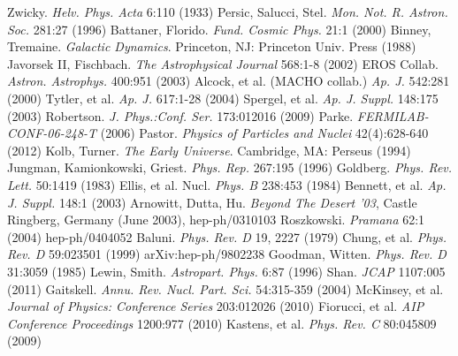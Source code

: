 \documentclass[a4paper,12pt]{article}
\begin{document}
{\begin{thebibliography}{1}
 Zwicky.  \emph{Helv. Phys. Acta} 6:110 (1933)
 Persic, Salucci, Stel.  \emph{Mon. Not. R. Astron. Soc.} 281:27 (1996)
 Battaner, Florido.  \emph{Fund. Cosmic Phys.} 21:1 (2000)
 Binney, Tremaine. \emph{Galactic Dynamics}. Princeton, NJ: Princeton Univ. Press (1988)
 Javorsek II, Fischbach. \emph{The Astrophysical Journal} 568:1-8 (2002)
 EROS Collab.  \emph{Astron. Astrophys.} 400:951 (2003)
 Alcock, et al. (MACHO collab.)  \emph{Ap. J.} 542:281 (2000)
 Tytler, et al. \emph{Ap. J.} 617:1-28 (2004)
 Spergel, et al. \emph{Ap. J. Suppl.} 148:175 (2003)
 Robertson. \emph{J. Phys.:Conf. Ser.} 173:012016 (2009)
 Parke.  \emph{FERMILAB-CONF-06-248-T} (2006)
 Pastor.  \emph{Physics of Particles and Nuclei} 42(4):628-640 (2012)
 Kolb, Turner. \emph{The Early Universe}.  Cambridge, MA: Perseus (1994)
 Jungman, Kamionkowski, Griest.  \emph{Phys. Rep.} 267:195 (1996)
 Goldberg.  \emph{Phys. Rev. Lett.} 50:1419 (1983)
 Ellis, et al. Nucl. \emph{Phys. B} 238:453 (1984)
 Bennett, et al. \emph{Ap. J. Suppl.} 148:1 (2003)
 Arnowitt, Dutta, Hu. \emph{Beyond The Desert '03}, Castle Ringberg, Germany (June 2003), hep-ph/0310103
 Roszkowski.  \emph{Pramana} 62:1 (2004) hep-ph/0404052
 Baluni. \emph{Phys. Rev. D} 19, 2227 (1979)
 Chung, et al.  \emph{Phys. Rev. D} 59:023501 (1999) arXiv:hep-ph/9802238
 Goodman, Witten. \emph{Phys. Rev. D} 31:3059 (1985)
 Lewin, Smith. \emph{Astropart. Phys.} 6:87 (1996)
 Shan. \emph{JCAP} 1107:005 (2011)
 Gaitskell.  \emph{Annu. Rev. Nucl. Part. Sci.} 54:315-359 (2004)
 McKinsey, et al.  \emph{Journal of Physics: Conference Series} 203:012026 (2010) 
 Fiorucci, et al.  \emph{AIP Conference Proceedings} 1200:977 (2010)
 Kastens, et al. \emph{Phys. Rev. C} 80:045809 (2009)


\end{thebibliography}}
\end{document}

